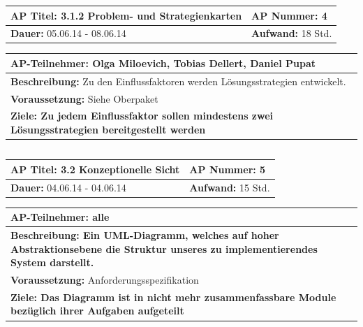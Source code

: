 \documentclass[fontsize=12pt,paper=a4,twoside]{scrartcl}
\begin{document}
\begin{tabular}{|p{7.43cm}|p{7.43cm}|}
\hline
\textbf{AP Titel: }3.1.2 Problem- und Strategienkarten & \textbf{AP Nummer: }4\\ 
\hline
\textbf{Dauer: }05.06.14 - 08.06.14& \textbf{Aufwand: }18 Std.\\
\hline
\end{tabular}
\begin{tabular}{|p{15.3cm}|}
\hline
\textbf{AP-Teilnehmer: }Olga Miloevich, Tobias Dellert, Daniel Pupat\\
\hline
\textbf{Beschreibung: }Zu den Einflussfaktoren werden Lösungsstrategien entwickelt. \\
\hline
\textbf{Voraussetzung: }Siehe Oberpaket\\
\hline 
\textbf{Ziele: Zu jedem Einflussfaktor sollen mindestens zwei Lösungsstrategien bereitgestellt werden}\\
\hline 
\end{tabular}
\begin{verbatim}

\end{verbatim}

\begin{tabular}{|p{7.43cm}|p{7.43cm}|}
\hline
\textbf{AP Titel: }3.2 Konzeptionelle Sicht & \textbf{AP Nummer: }5\\ 
\hline
\textbf{Dauer: }04.06.14 - 04.06.14& \textbf{Aufwand: }15 Std.\\
\hline
\end{tabular}
\begin{tabular}{|p{15.3cm}|}
\hline
\textbf{AP-Teilnehmer: }alle\\
\hline
\textbf{Beschreibung: Ein UML-Diagramm, welches auf hoher Abstraktionsebene
die Struktur unseres zu implementierendes System darstellt.}\\
\hline
\textbf{Voraussetzung: }Anforderungsspezifikation\\
\hline 
\textbf{Ziele: Das Diagramm ist in nicht mehr zusammenfassbare Module bezüglich ihrer
Aufgaben aufgeteilt}\\
\hline 
\end{tabular}
\begin{verbatim}

\end{verbatim}
\end{document}
